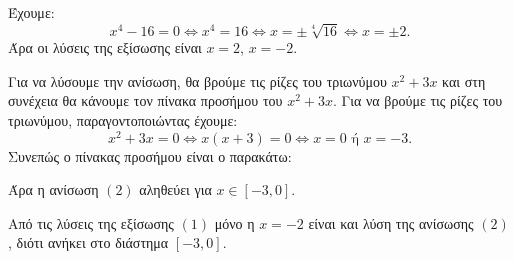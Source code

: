 
\begin{alist}
\item Έχουμε:
\[x^4 - 16 = 0 \Leftrightarrow x^4 = 16 \Leftrightarrow x = \pm\sqrt[4]{16} \Leftrightarrow x = \pm 2.\]
Άρα οι λύσεις της εξίσωσης είναι $x = 2$, $x = -2$.

\item Για να λύσουμε την ανίσωση, θα βρούμε τις ρίζες του τριωνύμου $x^2 + 3x$ και στη
συνέχεια θα κάνουμε τον πίνακα προσήμου του $x^2 + 3x$. Για να βρούμε τις ρίζες του
τριωνύμου, παραγοντοποιώντας έχουμε:
\[x^2 + 3x = 0 \Leftrightarrow x(x + 3) = 0 \Leftrightarrow x = 0 \text{ ή } x = -3.\]
Συνεπώς ο πίνακας προσήμου είναι ο παρακάτω:
\begin{center}
\end{center}
Άρα η ανίσωση $(2)$ αληθεύει για $x \in [-3, 0]$.

\item Από τις λύσεις της εξίσωσης $(1)$ μόνο η $x = -2$ είναι και λύση της ανίσωσης $(2)$, διότι ανήκει στο διάστημα $[-3, 0]$.
\end{alist}

